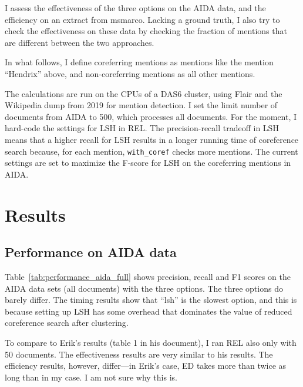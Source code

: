\documentclass[a4paper,11pt]{article}
\numberwithin{equation}{section} %
\begin{document}
I assess the effectiveness of the three options on the AIDA data, and the efficiency on an extract from msmarco. Lacking a ground truth, I also try to check the effectiveness on these data by checking the fraction of mentions that are different between the two approaches. 

In what follows, I define coreferring mentions as mentions like the mention ``Hendrix'' above, and non-coreferring mentions as all other mentions.

The calculations are run on the CPUs of a DAS6 cluster, using Flair and the Wikipedia dump from 2019 for mention detection. I set the limit number of documents from AIDA to 500, which processes all documents. 
For the moment, I hard-code the settings for LSH in REL. The precision-recall tradeoff in LSH means that a higher recall for LSH results in a longer running time of coreference search because, for each mention, \verb|with_coref| checks more mentions. 
The current settings are set to maximize the F-score for LSH on the coreferring mentions in AIDA.



\section{Results}

\subsection{Performance on AIDA data}

Table~\ref{tab:performance_aida_full} shows precision, recall and F1 scores on the AIDA data sets (all documents) with the three options.
The three options do barely differ. The timing results show that ``lsh'' is the slowest option, and this is because setting up LSH has some overhead that dominates the value of reduced coreference search after clustering.

To compare to Erik's results (table 1 in his document), I ran REL also only with 50 documents. The effectiveness results are very similar to his results. The efficiency results, however, differ---in Erik's case, ED takes more than twice as long than in my case. I am not sure why this is.
\end{document}

